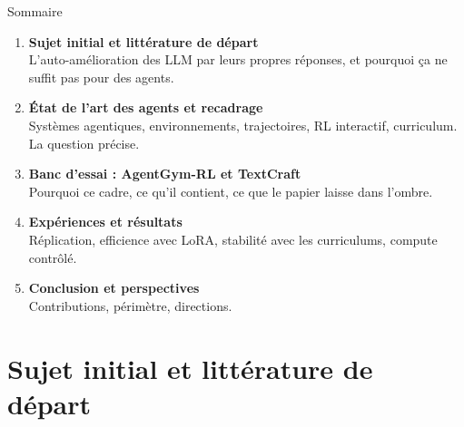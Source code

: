 \documentclass[aspectratio=169,10pt]{beamer}
\begin{document}
\begin{frame}{Sommaire}
\begin{enumerate}\setlength{\itemsep}{0.18cm}
  \item {\large\textbf{Sujet initial et littérature de départ}}\\
        {\color{crMid}\small L'auto-amélioration des LLM par leurs propres réponses, et pourquoi ça ne suffit pas pour des agents.}
  \item {\large\textbf{État de l'art des agents et recadrage}}\\
        {\color{crMid}\small Systèmes agentiques, environnements, trajectoires, RL interactif, curriculum. La question précise.}
  \item {\large\textbf{Banc d'essai : AgentGym-RL et TextCraft}}\\
        {\color{crMid}\small Pourquoi ce cadre, ce qu'il contient, ce que le papier laisse dans l'ombre.}
  \item {\large\textbf{Expériences et résultats}}\\
        {\color{crMid}\small Réplication, efficience avec LoRA, stabilité avec les curriculums, compute contrôlé.}
  \item {\large\textbf{Conclusion et perspectives}}\\
        {\color{crMid}\small Contributions, périmètre, directions.}
\end{enumerate}
\end{frame}

\section{Sujet initial et littérature de départ}
\end{document}
